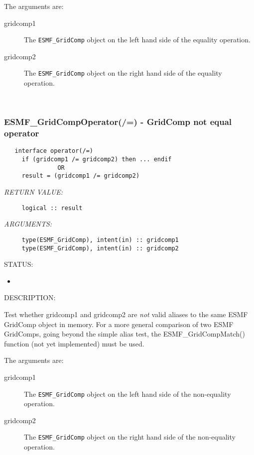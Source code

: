      The arguments are:
     \begin{description}
     \item[gridcomp1]
       The {\tt ESMF\_GridComp} object on the left hand side of the equality
       operation.
     \item[gridcomp2]
       The {\tt ESMF\_GridComp} object on the right hand side of the equality
       operation.
     \end{description}
   
 
\mbox{}\hrulefill\ 
 
\subsubsection [ESMF\_GridCompOperator(/=)] {ESMF\_GridCompOperator(/=) - GridComp not equal operator}


  
\begin{verbatim}   interface operator(/=)
     if (gridcomp1 /= gridcomp2) then ... endif
               OR
     result = (gridcomp1 /= gridcomp2)\end{verbatim}{\em RETURN VALUE:}
\begin{verbatim}     logical :: result\end{verbatim}{\em ARGUMENTS:}
\begin{verbatim}     type(ESMF_GridComp), intent(in) :: gridcomp1
     type(ESMF_GridComp), intent(in) :: gridcomp2\end{verbatim}
{\sf STATUS:}
   \begin{itemize}
   \item{}
   \end{itemize}
  
{\sf DESCRIPTION:\\ }


     Test whether gridcomp1 and gridcomp2 are {\it not} valid aliases to the
     same ESMF GridComp object in memory. For a more general comparison of two ESMF
     GridComps, going beyond the simple alias test, the ESMF\_GridCompMatch() function
     (not yet implemented) must be used.
  
     The arguments are:
     \begin{description}
     \item[gridcomp1]
       The {\tt ESMF\_GridComp} object on the left hand side of the non-equality
       operation.
     \item[gridcomp2]
       The {\tt ESMF\_GridComp} object on the right hand side of the non-equality
       operation.
     \end{description}
   
